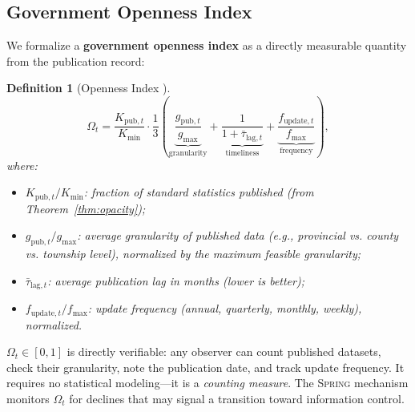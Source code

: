 \documentclass[11pt,a4paper]{article}
\newtheorem{definition}[theorem]{Definition}
\theoremstyle{definition}
\newcommand{\Spring}{\textsc{Spring}}
\begin{document}
\subsection{Government Openness Index}
We formalize a \textbf{government openness index} as a directly measurable quantity from the publication record:
\begin{definition}[Openness Index ]
\label{def:openness}
\begin{equation}
    \Omega_t = \frac{K_{\mathrm{pub}, t}}{K_{\min}} \cdot \frac{1}{3}\left(
        \underbrace{\frac{g_{\mathrm{pub}, t}}{g_{\max}}}_{\text{granularity}} +
        \underbrace{\frac{1}{1 + \bar{\tau}_{\mathrm{lag}, t}}}_{\text{timeliness}} +
        \underbrace{\frac{f_{\mathrm{update}, t}}{f_{\max}}}_{\text{frequency}}
    \right),
    \label{eq:openness}
\end{equation}
where:
\begin{itemize}
    \item $K_{\mathrm{pub}, t} / K_{\min}$: fraction of standard statistics published (from Theorem~\ref{thm:opacity});
    \item $g_{\mathrm{pub}, t} / g_{\max}$: average granularity of published data (e.g., provincial vs. county vs. township level), normalized by the maximum feasible granularity;
    \item $\bar{\tau}_{\mathrm{lag}, t}$: average publication lag in months (lower is better);
    \item $f_{\mathrm{update}, t} / f_{\max}$: update frequency (annual, quarterly, monthly, weekly), normalized.
\end{itemize}
\end{definition}
$\Omega_t \in [0, 1]$ is directly verifiable: any observer can count published datasets, check their granularity, note the publication date, and track update frequency. It requires no statistical modeling---it is a \textit{counting measure}. The \Spring{} mechanism monitors $\Omega_t$ for declines that may signal a transition toward information control.
\end{document}
